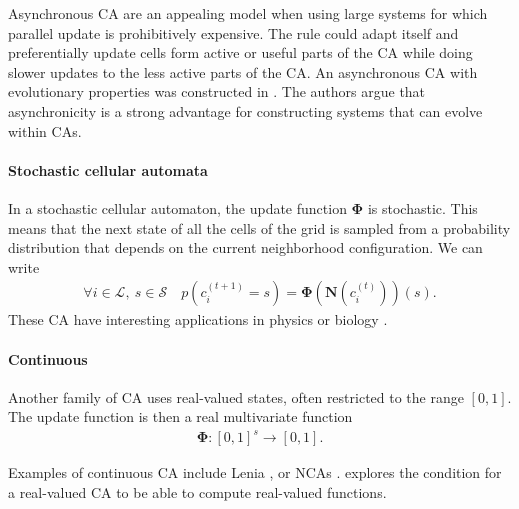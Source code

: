 Asynchronous \ac{CA} are an appealing model when using large systems for which
parallel update is prohibitively expensive. The rule could adapt itself and
preferentially update cells form active or useful parts of the \ac{CA} while
doing slower updates to the less active parts of the \ac{CA}. An asynchronous
\ac{CA} with evolutionary properties was constructed in
\parencite{nehanivEvolutionAsynchronousCellular2003}. The authors argue that
asynchronicity is a strong advantage for constructing systems that can evolve
within \acp{CA}.

\paragraph{Stochastic cellular automata}
In a stochastic cellular automaton, the update function $\boldsymbol{\Phi}$ is
stochastic. This means that the next state of all the cells of the grid is
sampled from a probability distribution that depends on the current neighborhood
configuration. We can write
\begin{equation}
\begin{aligned}
  \forall i \in \mathcal{L},\ s \in \mathcal{S} \quad p\left(c_{i}^{(t + 1)} = s \right) = \boldsymbol{\Phi} \left(\boldsymbol{N}\left(c_{i}^{(t)}\right)\right)(s).
\end{aligned}
\end{equation}
These \ac{CA} have interesting applications in physics
\parencite{vichniacSimulatingPhysicsCellular1984,
  ottaviSimulationIsingModel1989} or biology
\parencite{boasCellularPottsModel2018}.

\paragraph{Continuous}
Another family of \ac{CA} uses real-valued states, often restricted to the
range $[0, 1]$. The update function is then a real multivariate function
\begin{equation}
  \begin{aligned}
  \boldsymbol{\Phi}: [0, 1]^{s} \rightarrow [0, 1].
  \end{aligned}
  \label{eq:phi_cont}
\end{equation}

Examples of continuous \ac{CA} include Lenia
\parencite{chanLeniaBiologyArtificial2019a}, or \acp{NCA}
\parencite{mordvintsevGrowingNeuralCellular2020}.
\textcite{garzonRealComputationCellular1993} explores the condition for a
real-valued \ac{CA} to be able to compute real-valued functions.

